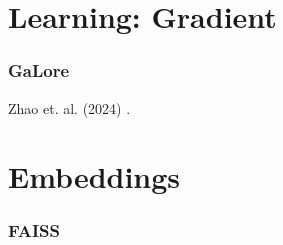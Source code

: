 \documentclass[10pt]{amsart}
\begin{document}
\begin{multicols*}{2}
\part{Learning: Gradient}

\section{GaLore}

Zhao et. al. (2024) \cite{ZZCW2024}.



\part{Embeddings}

\section{FAISS}



\end{multicols*}
\end{document}
